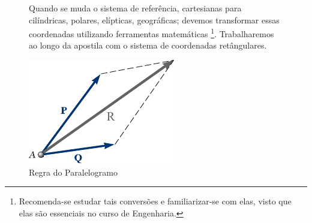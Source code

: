 \documentclass[a4paper, 14pt, twoside]{article}
\begin{document}
\begin{figure}[h]
\begin{minipage}[t]{0.60\textwidth}
    Quando se muda o sistema de referência, cartesianas para cilíndricas, polares, elípticas, geográficas; devemos transformar essas coordenadas utilizando ferramentas matemáticas \footnote{Recomenda-se estudar tais conversões e familiarizar-se com elas, visto que elas são essenciais no curso de Engenharia.}. Trabalharemos ao longo da apostila com o sistema de coordenadas \textcolor{lockheed}{retângulares.}
\end{minipage}
    \end{figure}

\begin{figure}[h]
    \begin{minipage}[t]{0.4\textwidth}
    \vspace{-1cm} %
    \centering
    \includegraphics[width=0.8\linewidth]{Figuras/somaparalelogramo.pdf}
    \caption{Regra do Paralelogramo}
\end{minipage}%
\hspace{0.05\textwidth}
\begin{minipage}[t]{0.55\textwidth}

\end{minipage}
\end{figure}
\end{document}
